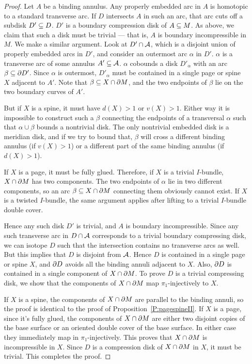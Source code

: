 \begin{proof}
Let $A$ be a binding annulus. Any properly embedded arc in $A$ is homotopic to
a standard transverse arc. If $D$ intersects $A$ in such an arc, that arc cuts
off a subdisk $D' \subseteq D$. $D'$ is a boundary compression disk of $A \subseteq M$.
As above, we claim that such a disk must be trivial --- that is, $A$ is
boundary incompressible in $M$.  We make a similar argument. Look at $D' \cap
\mathcal{A}$, which is a disjoint union of properly embedded arcs in $D'$, and consider
an outermost arc $\alpha$ in $D'$.  $\alpha$ is a transverse arc of some
annulus $A' \subseteq \mathcal{A}$. $\alpha$ cobounds a disk $D'_\alpha$ with an arc $\beta
\subseteq \partial D'$.  Since $\alpha$ is outermost, $D'_\alpha$ must be contained in
a single page or spine $X$ adjacent to $A'$. Note that $\beta \subseteq X \cap \partial
M$, and the two endpoints of $\beta$ lie on the two boundary curves of $A'$.

But if $X$ is a spine, it must have $d(X)>1$ or $v(X)>1$. Either way it is
impossible to construct such a $\beta$ connecting the endpoints of
a transversal $\alpha$ such that $\alpha \cup \beta$ bounds a nontrivial disk.
The only nontrivial embedded disk is a meridian disk, and if we try to bound
that, $\beta$ will cross a different binding annulus (if $v(X)>1$) or
a different part of the same binding annulus (if $d(X)>1$).

If $X$ is a page, it must be fully glued. Therefore, if $X$ is a trivial
$I$-bundle, $X \cap \partial M$ has two components. The two endpoints of $\alpha$
lie in two different components, so an arc $\beta \subseteq X \cap \partial M$ connecting
them obviously cannot exist. If $X$ is a twisted $I$-bundle, the same argument
applies after lifting to a trivial $I$-bundle double cover.

Hence any such disk $D'$ is trivial, and $A$ is boundary incompressible. Since
any such transverse arc in $D \cap \mathcal{A}$ corresponds to a trivial boundary
compressing disk, we can isotope $D$ such that the intersection contains no
transverse arcs as well. But this implies that $D$ is disjoint from $\mathcal{A}$.
Hence $D$ is contained in a single page or spine $X$, and $\partial D$ avoids all
the binding annuli adjacent to $X$.  Also, $\partial D$ is contained in a single
component of $X \cap \partial M$. To prove $D$ is a trivial compressing disk, we
show that the components of $X \cap \partial M$ map $\pi_1$-injectively to $X$.

If $X$ is a spine, the components of $X \cap \partial M$ are parallel to the binding
annuli, so the proof is identical to the proof of
Proposition~\ref{P:pagespineII}. If $X$ is a page, since it's fully glued, the
components of $X \cap \partial M$ are either two disjoint copies of the base surface
or an oriented double cover of the base surface. In either case they
immediately map in $\pi_1$-injectively. This proves that $X \cap \partial M$ is
incompressible in $X$.  Since $D$ is a compression disk of $X \cap \partial M$ in
$X$, it must be trivial. This completes the proof.

\end{proof}

